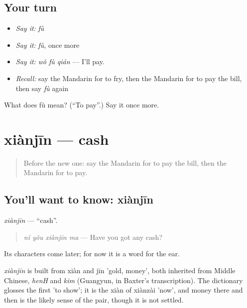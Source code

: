 \subsection*{Your turn}
\begin{itemize}
\raggedright
  \item \emph{Say it:} \emph{fù}
  \item \emph{Say it:} \emph{fù}, once more
  \item \emph{Say it:} \emph{wǒ fù qián} — I'll pay.
  \item \emph{Recall:} say the Mandarin for to fry, then the Mandarin for to pay the bill, then say \emph{fù} again
\end{itemize}

\begin{tcolorbox}[breakable,colback=teal!4,colframe=teal!35!black,title={Before you move on}]
What does fù mean? (\textquotedblleft{}To pay\textquotedblright{}.) Say it once more.
\end{tcolorbox}
\section[xiànjīn]{xiànjīn — cash}

\label{lesson:ZH-C114-xianjin}



\begin{quote}
Before the new one: say the Mandarin for to pay the bill, then the Mandarin for to pay.
\end{quote}

\subsection*{You'll want to know: xiànjīn}
\emph{xiànjīn} — \textquotedblleft{}cash\textquotedblright{}.

\begin{quote}
\emph{nǐ yǒu xiànjīn ma} — Have you got any cash?
\end{quote}

Its characters come later; for now it is a word for the ear.

\begin{cousinweb}
\emph{xiànjīn} is built from xiàn and jīn 'gold, money', both inherited from Middle Chinese, \emph{henH} and \emph{kim} (Guangyun, in Baxter's transcription). The dictionary glosses the first 'to show'; it is the xiàn of xiànzài 'now', and money there and then is the likely sense of the pair, though it is not settled.
\end{cousinweb}

